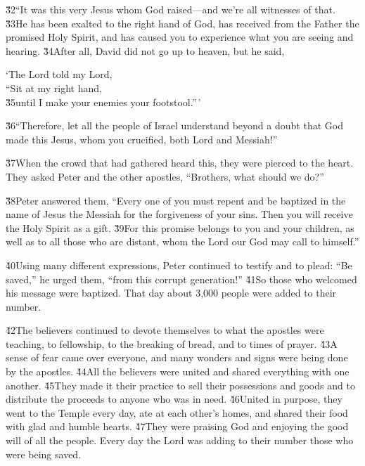 \v{32}``It was this very Jesus whom God raised---and we're all witnesses of that. \v{33}He has been exalted to the right hand of God, has received from the Father the promised Holy Spirit, and has caused you to experience what you are seeing and hearing. \v{34}After all, David did not go up to heaven, but he said,

\begin{poetry}
\poeml `The Lord told my Lord, \\
\poemll    ``Sit at my right hand, \\
\poeml \v{35}until I make your enemies your footstool.''\,'
\end{poetry}

\v{36}``Therefore, let all the people of Israel understand beyond a doubt that God made this Jesus, whom you crucified, both Lord and Messiah!''

\v{37}When the crowd that had gathered heard this, they were pierced to the heart. They asked Peter and the other apostles, ``Brothers, what should we do?''

\v{38}Peter answered them, ``Every one of you must repent and be baptized in the name of Jesus the Messiah for the forgiveness of your sins. Then you will receive the Holy Spirit as a gift. \v{39}For this promise belongs to you and your children, as well as to all those who are distant, whom the Lord our God may call to himself.''

\v{40}Using many different expressions, Peter continued to testify and to plead: ``Be saved,'' he urged them, ``from this corrupt generation!'' \v{41}So those who welcomed his message were baptized. That day about 3,000 people were added to their number.

\v{42}The believers continued to devote themselves to what the apostles were teaching, to fellowship, to the breaking of bread, and to times of prayer. \v{43}A sense of fear came over everyone, and many wonders and signs were being done by the apostles. \v{44}All the believers were united and shared everything with one another. \v{45}They made it their practice to sell their possessions and goods and to distribute the proceeds to anyone who was in need. \v{46}United in purpose, they went to the Temple every day, ate at each other's homes, and shared their food with glad and humble hearts. \v{47}They were praising God and enjoying the good will of all the people. Every day the Lord was adding to their number those who were being saved.

